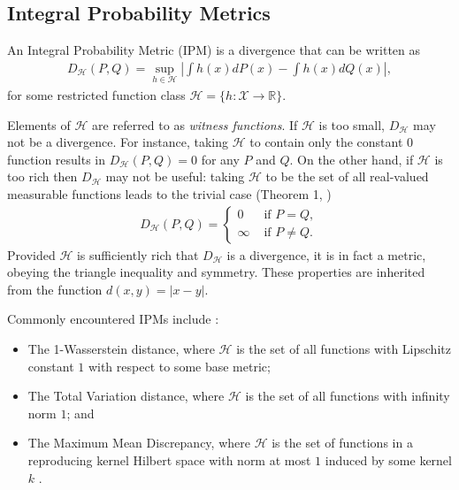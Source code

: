 \subsection{Integral Probability Metrics}\label{subsec:intro-ipm}

\begin{definition}
An Integral Probability Metric (IPM) is a divergence that can be written as
%
\begin{align*}
D_{\mathcal{H}}(P, Q) = \sup_{h\in\mathcal{H}} \left| \int h(x) dP(x) - \int h(x) dQ(x) \right|,
\end{align*}
%
for some restricted function class $\mathcal{H} = \{h: \mathcal{X} \to \mathbb{R} \}$. 
\end{definition}

Elements of $\mathcal{H}$ are referred to as \emph{witness functions}.
If $\mathcal{H}$ is too small, $D_\mathcal{H}$ may not be a divergence.
For instance, taking $\mathcal{H}$ to contain only the constant $0$ function results in $D_{\mathcal{H}}(P, Q) = 0$ for any $P$ and $Q$.
On the other hand, if $\mathcal{H}$ is too rich then $D_{\mathcal{H}}$ may not be useful: 
taking $\mathcal{H}$ to be the set of all real-valued measurable functions leads to the trivial case (Theorem 1, \cite{sriperumbudur2009integral})
\begin{align*}
D_{\mathcal{H}}(P, Q) = \begin{cases} 0 &\text{ if } P = Q, \\ \infty &\text{ if } P \not= Q .\end{cases}
\end{align*}
%
Provided $\mathcal{H}$ is sufficiently rich that $D_{\mathcal{H}}$ is a divergence, it is in fact a metric, obeying the triangle inequality and symmetry.
These properties are inherited from the function $d(x,y) = |x - y|$.


Commonly encountered IPMs include \citep{muller1997integral, sriperumbudur2009integral}:
\begin{itemize}	
\item The 1-Wasserstein distance, where $\mathcal{H}$ is the set of all functions with Lipschitz constant $1$ with respect to some base metric;
\item The Total Variation distance, where $\mathcal{H}$ is the set of all functions with infinity norm $1$; and
\item The Maximum Mean Discrepancy, where $\mathcal{H}$ is the set of functions in a reproducing kernel Hilbert space with norm at most $1$ induced by some kernel $k$ \citep{gretton2012kernel}.
\end{itemize}
 
